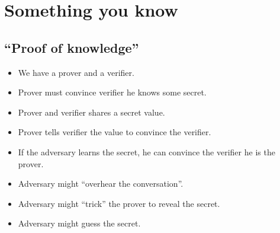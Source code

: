 \mode*




\section{Something you know}

\subsection{\enquote{Proof of knowledge}}

\begin{frame}
  \begin{idea}
    \begin{itemize}
      \item We have a prover and a verifier.
      \item Prover must convince verifier he knows some secret.
    \end{itemize}
  \end{idea}

  \begin{idea}[Password]
    \begin{itemize}
      \item Prover and verifier shares a secret value.
      \item Prover tells verifier the value to convince the verifier.
    \end{itemize}
  \end{idea}
\end{frame}

\begin{frame}
  \begin{remark}
    \begin{itemize}
      \item If the adversary learns the secret, he can convince the verifier he 
        is the prover.
    \end{itemize}
  \end{remark}

  \begin{example}
    \begin{itemize}
      \item Adversary might \enquote{overhear the conversation}.
      \item Adversary might \enquote{trick} the prover to reveal the secret.
      \item Adversary might guess the secret.
    \end{itemize}
  \end{example}
\end{frame}


